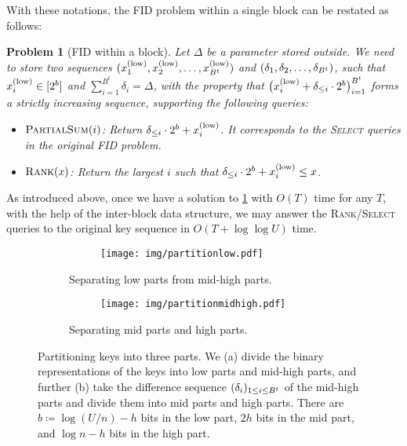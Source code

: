 \documentclass{article}
\theoremstyle{plain}
\newtheorem{prob}{Problem}  \newtheorem{open}[prob]{Open Question}
\theoremstyle{definition}  \newtheorem{definition}[theorem]{Definition}
\DeclarePairedDelimiter{\bk}{(}{)}
\newcommand{\defeq}{\coloneqq}
\newcommand{\xlow}[1][i]{x_{#1}^{(\textup{low})}}
\newcommand{\rank}{\textup{\textsc{Rank}}\xspace}
\newcommand{\select}{\textup{\textsc{Select}}\xspace}
\newcommand{\partialsum}{\textup{\textsc{PartialSum}}\xspace}
\begin{document}
With these notations, the FID problem within a single block can be restated as follows:
\begin{prob}[FID within a block]
  \label{prob:FID_within_block}
  Let $\Delta$ be a parameter stored outside. We need to store two sequences $\bk{\xlow[1], \xlow[2], \ldots, \xlow[B^t]}$ and $\bk{\delta_1, \delta_2, \ldots, \delta_{B^t}}$, such that $\xlow \in [2^b]$ and $\sum_{i=1}^{B^t} \delta_i = \Delta$, with the property that $\bk[\big]{\xlow + \delta_{\le i} \cdot 2^b}_{i = 1}^{B^t}$ forms a strictly increasing sequence, supporting the following queries:
  \begin{itemize}
  \item $\partialsum(i)$: Return $\delta_{\le i} \cdot 2^b + \xlow$. It corresponds to the \select queries in the original FID problem.
  \item $\rank(x)$: Return the largest $i$ such that $\delta_{\le i} \cdot 2^b + \xlow \le x$.
  \end{itemize}
\end{prob}

As introduced above, once we have a solution to \cref{prob:FID_within_block} with $O(T)$ time for any $T$, with the help of the inter-block data structure, we may answer the \rank/\select queries to the original key sequence in $O(T + \log \log U)$ time.

\begin{figure}[ht]
  \centering
  \begin{subfigure}[c]{6.5cm}
    \begin{subfigure}[c][4cm][c]{6.5cm}
      \vspace{0.1cm}
      \hspace{0.4cm}
      \texttt{[image: img/partitionlow.pdf]}
    \end{subfigure}
    \caption{Separating low parts from mid-high parts.}
    \label{fig:partition_low}
    \centering
  \end{subfigure}
  \hspace{1cm}
  \hspace{0.5cm}  \begin{subfigure}[c]{6cm}
    \begin{subfigure}[c][4cm][c]{6cm}
      \texttt{[image: img/partitionmidhigh.pdf]}
    \end{subfigure}
    \caption{Separating mid parts and high parts.}
    \label{fig:3partition}
    \centering
  \end{subfigure}
  \hspace{1cm}
  \caption{Partitioning keys into three parts. We (a) divide the binary representations of the keys into low parts and mid-high parts, and further (b) take the difference sequence $\bk{\delta_i}_{1 \le i \le B^t}$ of the mid-high parts and divide them into mid parts and high parts. There are $b \defeq \log (U/n) - h$ bits in the low part, $2h$ bits in the mid part, and $\log n - h$ bits in the high part.}
  \label{fig:partition_combined}
\end{figure}
\end{document}
